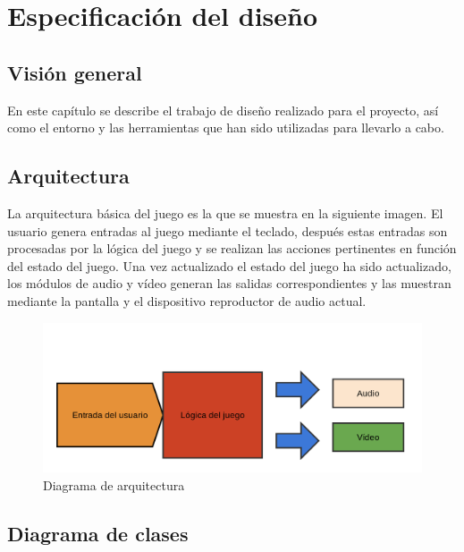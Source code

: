 \chapter{Especificación del diseño}

\section{Visión general}

	En este capítulo se describe el trabajo de diseño realizado para el proyecto, así como el entorno y las herramientas que han sido utilizadas para llevarlo a cabo.

\section{Arquitectura}

	La arquitectura básica del juego es la que se muestra en la siguiente imagen. El usuario genera entradas al juego mediante el teclado, después estas entradas son procesadas por la lógica del juego y se realizan las acciones pertinentes en función del estado del juego. Una vez actualizado el estado del juego ha sido actualizado, los módulos de audio y vídeo generan las salidas correspondientes y las muestran mediante la pantalla y el dispositivo reproductor de audio actual.

	\begin{figure}[!htp]
		 \centering
		 \includegraphics[scale=.15]{fig/architecture}
		 \caption{Diagrama de arquitectura}
		 \label{fig:arch}
	\end{figure}

	\FloatBarrier
	\clearpage

\section{Diagrama de clases}

